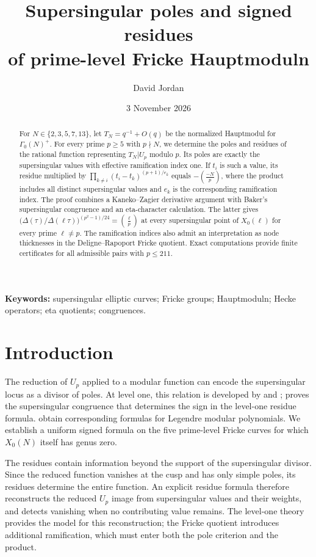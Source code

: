 \documentclass[11pt,a4paper]{article}
\title{Supersingular poles and signed residues\\of prime-level Fricke Hauptmoduln}
\author{David Jordan}
\date{3 November 2026}
\numberwithin{equation}{section}
\theoremstyle{definition}
\theoremstyle{remark}
\begin{document}
\maketitle
\begin{abstract}
For $N\in\{2,3,5,7,13\}$, let $T_N=q^{-1}+O(q)$ be the normalized Hauptmodul for
$\Gamma_0(N)^+$. For every prime $p\ge5$ with $p\nmid N$, we determine the poles and
residues of the rational function representing $T_N|U_p$ modulo $p$. Its poles are
exactly the supersingular values with effective ramification index one. If $t_i$ is
such a value, its residue multiplied by
$\prod_{k\ne i}(t_i-t_k)^{(p+1)/e_k}$ equals $-\left(\frac{-N}{p}\right)$, where the
product includes all distinct supersingular values and $e_k$ is the corresponding
ramification index. The proof combines a Kaneko--Zagier derivative argument with
Baker's supersingular congruence and an eta-character calculation. The latter gives
$\bigl(\Delta(\tau)/\Delta(\ell\tau)\bigr)^{(p^2-1)/24}=\left(\frac{\ell}{p}\right)$
at every supersingular point of $X_0(\ell)$ for every prime $\ell\ne p$.
The ramification indices also admit an interpretation as node thicknesses in the
Deligne--Rapoport Fricke quotient. Exact computations provide finite certificates
for all admissible pairs with $p\le211$.
\end{abstract}
\noindent\textbf{Keywords:} supersingular elliptic curves; Fricke groups; Hauptmoduln; Hecke operators; eta quotients; congruences.

\section{Introduction}\label{sec:intro}
The reduction of $U_p$ applied to a modular function can encode the supersingular
locus as a divisor of poles. At level one, this relation is developed by \citet{dS94} and \citet[\S10]{KZ98}; \citet{Baker98} proves the
supersingular congruence that determines the sign in the level-one residue formula.
\citet{BL18} obtain corresponding formulas for Legendre modular
polynomials. We establish a uniform signed formula on the five prime-level Fricke
curves for which $X_0(N)$ itself has genus zero.

The residues contain information beyond the support of the supersingular divisor.
Since the reduced function vanishes at the cusp and has only simple poles, its
residues determine the entire function. An explicit residue formula therefore
reconstructs the reduced $U_p$ image from supersingular values and their weights,
and detects vanishing when no contributing value remains. The level-one theory
provides the model for this reconstruction; the Fricke quotient introduces
additional ramification, which must enter both the pole criterion and the product.
\end{document}
